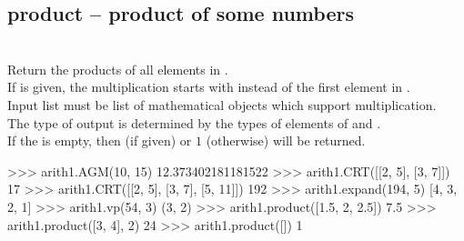 \subsection{product -- product of some numbers}
\\
\spacing
\quad Return the products of all elements in . \\
\spacing
\quad If  is given, the multiplication starts with  instead of the first element in .\\
\spacing
\quad Input list  must be list of mathematical objects which support multiplication.\\
The type of output  is determined by the types of elements of  and .\\
If the  is empty, then  (if given) or \(1\) (otherwise) will be returned.\\
%
\begin{ex}
>>> arith1.AGM(10, 15)
12.373402181181522
>>> arith1.CRT([[2, 5], [3, 7]])
17
>>> arith1.CRT([[2, 5], [3, 7], [5, 11]])
192
>>> arith1.expand(194, 5)
[4, 3, 2, 1]
>>> arith1.vp(54, 3)
(3, 2)
>>> arith1.product([1.5, 2, 2.5])
7.5
>>> arith1.product([3, 4], 2)
24
>>> arith1.product([])
1
\end{ex}



